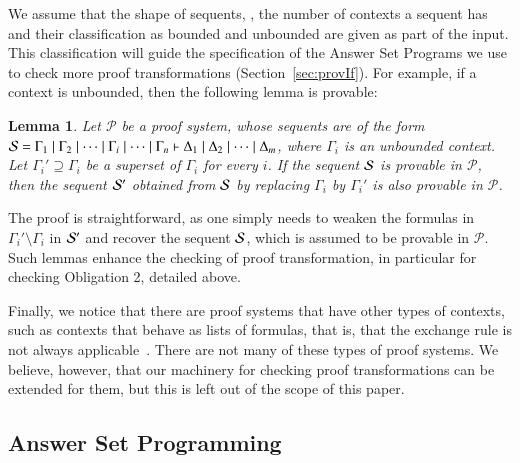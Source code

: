 \documentclass{new_tlp}
\newtheorem{lemma}[theorem]{Lemma}
\begin{document}
We assume that the shape of sequents, 
\ie, the number of contexts a sequent has and their classification as bounded and unbounded 
 are given as part of the input.
This classification will guide the specification of the Answer Set Programs we use to 
check more proof transformations (Section~\ref{sec:provIf}). 
For example, if a context is unbounded, then the following lemma is provable:
\begin{lemma}
\label{lem:unbounded}
Let $\mathcal{P}$ be a proof system, whose sequents are of the form $\Sscr =
\Gamma_1 \mid \Gamma_2 \mid \cdots \mid \Gamma_i \mid \cdots \mid \Gamma_n
\vdash \Delta_1 \mid \Delta_2 \mid \cdots \mid \Delta_m$, where $\Gamma_i$ is an
unbounded context. Let $\Gamma_i' \supseteq \Gamma_i$ be a superset of $\Gamma_i$ for every $i$.
If the sequent $\Sscr$ is provable in $\mathcal{P}$, then the sequent $\Sscr'$
obtained from $\Sscr$ by replacing $\Gamma_i$ by $\Gamma_i'$ is also provable in
$\mathcal{P}$. 
\end{lemma}
The proof is straightforward, as one simply needs to weaken the formulas in $\Gamma_i'\setminus \Gamma_i$
in $\Sscr'$ and recover the sequent $\Sscr$, which is assumed to be provable in
$\mathcal{P}$.
Such lemmas enhance the checking of proof transformation, in particular for checking Obligation 2, 
detailed above.

Finally, we notice that there are proof systems that have other types of contexts, such as  
contexts that behave as lists of formulas, that is, that the exchange rule is not always
applicable~\cite{pfenning09lics}. There are not many of these types of proof systems. We believe, however, 
that our machinery for checking proof transformations can be extended for them, but 
this is left out of the scope of this paper.

\vspace{-2mm}
\subsection{Answer Set Programming}
\end{document}
